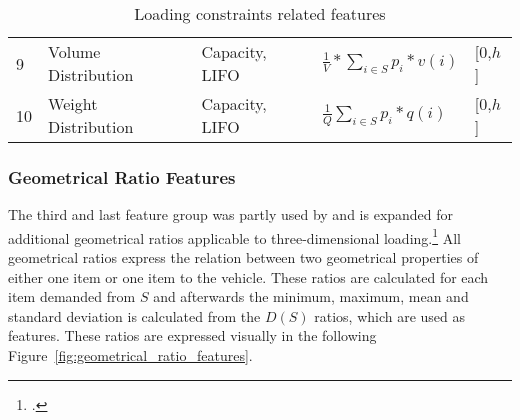 \begin{table}[ht]
\begin{tabular}{@{}P{0.08\textwidth}P{0.16\textwidth}P{0.26\textwidth}P{0.28\textwidth}@{}P{0.1\textwidth}@{}}
        9  & Volume Distribution                                                                             & Capacity, \gls{LIFO}   & $\displaystyle\frac{1}{V}*\sum_{i \in S}p_i * v(i)$                                               & [0,$h$] \\
        10 & Weight Distribution                                                                             & Capacity, \gls{LIFO}   & $\displaystyle\frac{1}{Q}\sum_{i \in S}p_i * q(i)$                                                & [0,$h$] \\
        \bottomrule
    \end{tabular}
    \caption{Loading constraints related features}
    \label{tab:loading_constraints_features}
\end{table}

\clearpage

\subsubsection{Geometrical Ratio Features}
The third and last feature group
was partly used by \cite{zhang_learning-based_2022} and is expanded for additional geometrical ratios applicable to three-dimensional loading.\footcite[cf.][p. 14]{zhang_learning-based_2022}
All geometrical ratios express the relation between two geometrical properties of either one item or one item to the vehicle. These ratios
are calculated for each item demanded from $S$ and afterwards the minimum, maximum, mean and standard deviation is calculated
from the $D(S)$ ratios, which are used as features. These ratios are expressed visually in the following Figure~\ref{fig:geometrical_ratio_features}.


